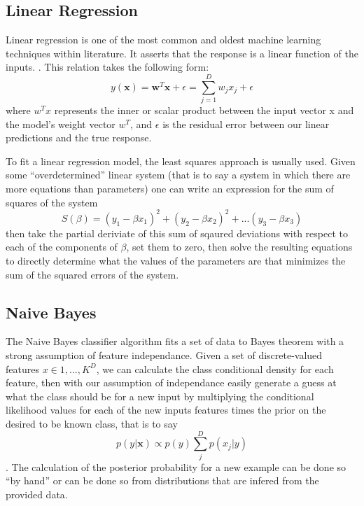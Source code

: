 \documentclass[a4paper,11pt]{article}
\begin{document}
\subsection{Linear Regression}
Linear regression is one of the most common and oldest machine learning techniques within
literature. It asserts that the response is a linear function of the inputs. \cite{Murphy}.
This relation takes the following form:
$$y(\textbf{x}) = \textbf{w}^T\textbf{x} + \epsilon = \sum_{j=1}^{D}w_jx_j + \epsilon$$
where $w^Tx$ represents the inner or scalar product between the input vector x and the
model's weight vector $w^T$, and $\epsilon$ is the residual error between our linear predictions
and the true response.

 To fit a linear regression model, the least squares approach is usually used. Given some
 ``overdetermined'' linear system (that is to say a system in which there are more equations
than parameters) one can write an expression for the sum of squares of the system
$$S(\beta) = (y_1 - \beta x_1)^2 + (y_2 - \beta x_2)^2 + ... (y_3 - \beta x_3)$$
 then take the partial deriviate of this sum of sqaured deviations with respect to each of
the components of $\beta$, set them to zero, then solve the resulting equations to directly
determine what the values of the parameters are that minimizes the sum of the squared errors of
the system.

 \subsection{Naive Bayes}
The Naive Bayes classifier algorithm fits a set of data to Bayes theorem with a strong assumption of
feature independance. Given a set of discrete-valued features $x \in {1,...,K}^D$, we can calculate
the class conditional density for each feature, then with our assumption of independance easily generate
a guess at what the class should be for a new input by multiplying the conditional likelihood values
for each of the new inputs features times the prior on the desired to be known class, that is to say
$$p(y|\textbf{x}) \propto p(y) \sum_{j}^{D}p(x_j|y)$$. The calculation of the posterior probability for a new
example can be done so ``by hand'' or can be done so from distributions that are infered from the
provided data.
\end{document}
